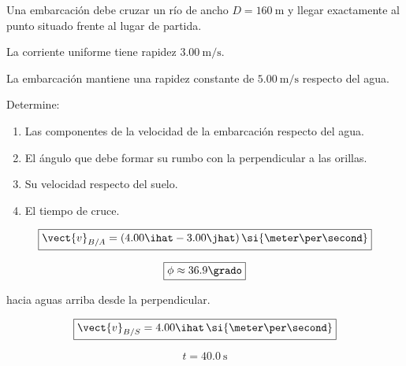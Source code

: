 \begin{ejercicio}
Una embarcación debe cruzar un río de ancho
\(D=\SI{160}{\meter}\) y llegar exactamente
al punto situado frente al lugar de partida.

La corriente uniforme tiene rapidez
\(\SI{3.00}{\meter\per\second}\).

La embarcación mantiene una rapidez constante
de \(\SI{5.00}{\meter\per\second}\)
respecto del agua.

Determine:

\begin{enumerate}[label=\alph*)]
    \item Las componentes de la velocidad
    de la embarcación respecto del agua.
    \item El ángulo que debe formar su rumbo
    con la perpendicular a las orillas.
    \item Su velocidad respecto del suelo.
    \item El tiempo de cruce.
\end{enumerate}
\end{ejercicio}

\begin{respuesta}
\[
\boxed{
\vect{v}_{B/A}
=
(4.00\ihat-3.00\jhat)\,
\si{\meter\per\second}
}
\]

\[
\boxed{
\phi\approx36.9\grado
}
\]

hacia aguas arriba desde la perpendicular.

\[
\boxed{
\vect{v}_{B/S}
=
4.00\ihat\,
\si{\meter\per\second}
}
\]

\[
\boxed{
t=\SI{40.0}{\second}
}
\]
\end{respuesta}

